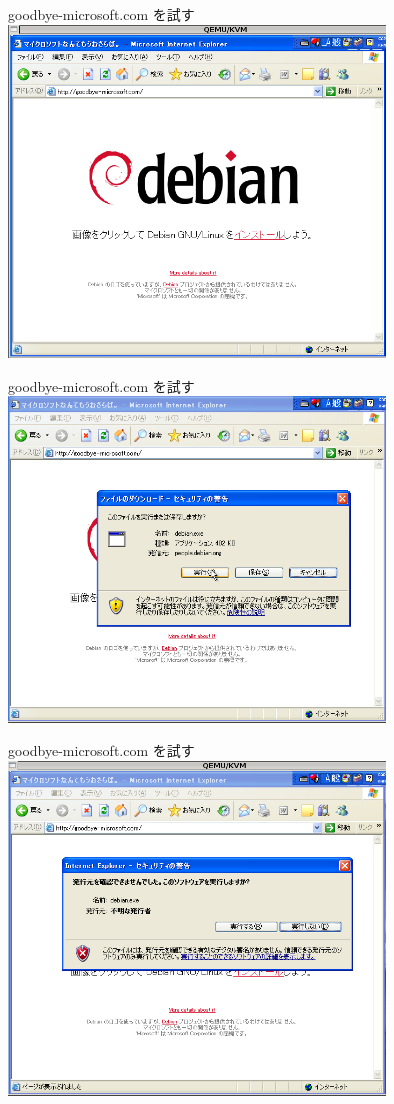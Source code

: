 \documentclass[cjk,dvipdfmx]{beamer}
\begin{document}
\begin{frame}[containsverbatim]{goodbye-microsoft.com を試す}
\includegraphics[width=10cm]{image200703/goodbyemicrosoftcom1.png}
\end{frame}
\begin{frame}[containsverbatim]{goodbye-microsoft.com を試す}
\includegraphics[width=10cm]{image200703/goodbyemicrosoftcom2.png}\\
\end{frame}
\begin{frame}[containsverbatim]{goodbye-microsoft.com を試す}
\includegraphics[width=10cm]{image200703/goodbyemicrosoftcom3.png}
\end{frame}
\end{document}
